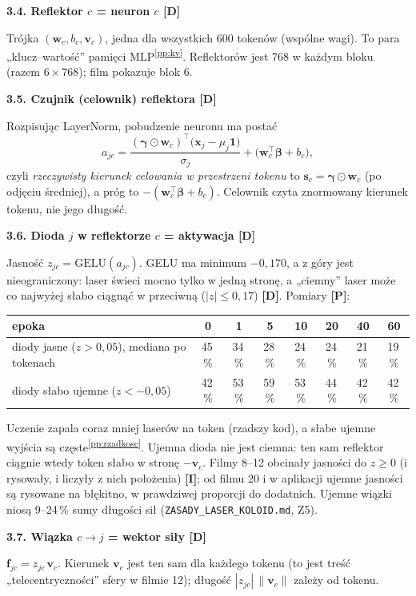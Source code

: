\documentclass[a4paper,11pt]{article}
\newcommand{\stD}{\textcolor{dok}{\textsf{\textbf{[D]}}}}
\newcommand{\stP}{\textcolor{pom}{\textsf{\textbf{[P]}}}}
\newcommand{\stI}{\textcolor{ilu}{\textsf{\textbf{[I]}}}}
\newcommand{\GELU}{\mathrm{GELU}}
\newcommand{\pp}[1]{\textsuperscript{\ref{pp:#1}}}
\newcommand{\elem}[1]{\par\medskip\noindent\textbf{#1}\par\nopagebreak}
\begin{document}
\elem{3.4. Reflektor $c$ = neuron $c$ \stD}
Trójka $(\bm w_c, b_c, \bm v_c)$, jedna dla wszystkich 600 tokenów (wspólne wagi). To para „klucz--wartość” pamięci MLP\pp{kv}.
Reflektorów jest 768 w każdym bloku (razem $6\times768$); film pokazuje blok 6.

\elem{3.5. Czujnik (celownik) reflektora \stD}
Rozpisując LayerNorm, pobudzenie neuronu ma postać
\begin{equation}
a_{jc} = \frac{(\bm\gamma\odot\bm w_c)^{\!\top}\big(\bm x_j-\mu_j\bm 1\big)}{\sigma_j} + \big(\bm w_c^{\!\top}\bm\beta+b_c\big),
\end{equation}
czyli \emph{rzeczywisty kierunek celowania w przestrzeni tokenu} to $\bm s_c=\bm\gamma\odot\bm w_c$ (po odjęciu średniej), a próg
to $-(\bm w_c^{\!\top}\bm\beta+b_c)$. Celownik czyta znormowany kierunek tokenu, nie jego długość.

\elem{3.6. Dioda $j$ w reflektorze $c$ = aktywacja \stD}
Jasność $z_{jc}=\GELU(a_{jc})$. GELU ma minimum $-0{,}170$, a z góry jest nieograniczony: laser świeci mocno tylko w jedną stronę,
a „ciemny” laser może co najwyżej słabo ciągnąć w przeciwną ($|z|\le0{,}17$) \stD. Pomiary \stP:
\begin{center}\small
\begin{tabular}{lccccccc}\toprule
epoka & 0 & 1 & 5 & 10 & 20 & 40 & 60\\\midrule
diody jasne ($z>0{,}05$), mediana po tokenach & 45\,\% & 34\,\% & 28\,\% & 24\,\% & 24\,\% & 21\,\% & 19\,\%\\
diody słabo ujemne ($z<-0{,}05$) & 42\,\% & 53\,\% & 59\,\% & 53\,\% & 44\,\% & 42\,\% & 42\,\%\\\bottomrule
\end{tabular}
\end{center}
Uczenie zapala coraz mniej laserów na token (rzadszy kod), a słabe ujemne wyjścia są częste\pp{rzadkosc}.
Ujemna dioda nie jest ciemna: ten sam reflektor ciągnie wtedy token słabo w stronę $-\bm v_c$. Filmy 8--12 obcinały jasności do $z\ge0$
(i rysowały, i liczyły z nich położenia) \stI; od filmu 20 i w aplikacji ujemne jasności są rysowane na błękitno, w prawdziwej
proporcji do dodatnich. Ujemne wiązki niosą 9--24\,\% sumy długości sił (\texttt{ZASADY\_LASER\_KOLOID.md}, Z5).

\elem{3.7. Wiązka $c\to j$ = wektor siły \stD}
$\bm f_{jc}=z_{jc}\,\bm v_c$. Kierunek $\bm v_c$ jest ten sam dla każdego tokenu (to jest treść „telecentryczności” sfery w filmie 12);
długość $|z_{jc}|\,\lVert\bm v_c\rVert$ zależy od tokenu.
\end{document}
